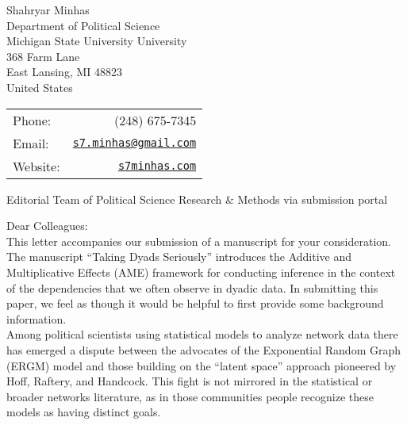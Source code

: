 \documentclass[letterpaper]{article}
\begin{document}
\thispagestyle{empty}



  \begin{minipage}{0.64\linewidth}
Shahryar Minhas \\
Department of Political Science \\
Michigan State University University \\
368 Farm Lane \\
East Lansing, MI 48823\\
United States
\end{minipage}
\begin{minipage}{0.45\linewidth}
  \begin{tabular}{lr}
    Phone: & (248) 675-7345 \\
    Email: & \href{mailto:s7.minhas@gmail.com}{\tt s7.minhas@gmail.com}  \\
    Website:& \href{http://s7minhas.com/}{\tt s7minhas.com}
  \end{tabular}
\end{minipage}

\vspace{.5in}

{Editorial Team of Political Science Research \& Methods via submission portal}

\vspace{0.25in}

Dear Colleagues:\\[1ex]

This letter accompanies our submission of a manuscript for your consideration. The manuscript ``Taking Dyads Seriously'' introduces the Additive and Multiplicative Effects (AME) framework for conducting inference in the context of the dependencies that we often observe in dyadic data. In submitting this paper, we feel as though it would be helpful to first provide some background information. \\[1ex]

Among political scientists using statistical models to analyze network data there has emerged a dispute between the advocates of the Exponential Random Graph (ERGM) model and those building on the ``latent space'' approach pioneered by Hoff, Raftery, and Handcock. This fight is not mirrored in the statistical or broader networks literature, as in those communities people recognize these models as having distinct goals. \\[1ex]
\end{document}

